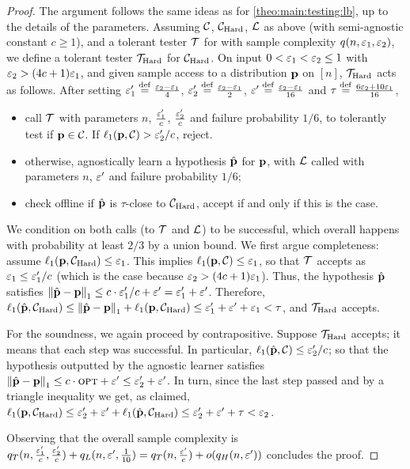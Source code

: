 \begin{proof}
The argument follows the same ideas as for \cref{theo:main:testing:lb}, up to the details of the parameters. Assuming $\class$, $\class_{\rm Hard}$, $\Learner$ as above (with semi-agnostic constant $c \geq 1$), and a tolerant tester $\Tester$ for \class with sample complexity $q(n,\eps_1,\eps_2)$, we define a tolerant tester $\Tester_{\rm Hard}$ for $\class_{\rm Hard}$. On input $0 < \eps_1 < \eps_2 \leq 1$ with $\eps_2 > (4c+1)\eps_1$, and given sample access to a distribution $\D$ on $[n]$, $\Tester_{\rm Hard}$ acts as follows. After setting $\eps^\prime_1\eqdef\frac{\eps_2-\eps_1}{4}$, $\eps^\prime_2\eqdef\frac{\eps_2-\eps_1}{2}$, $\eps^\prime \eqdef \frac{\eps_2-\eps_1}{16}$ and $\tau\eqdef \frac{6\eps_2+10\eps_1}{16}$,
\begin{itemize}
  \item call $\Tester$ with parameters $n$, $\frac{\eps^\prime_1}{c}$, $\frac{\eps^\prime_2}{c}$ and failure probability $1/6$, to tolerantly test if $\D\in\class$. If $\lp[1](\D,\class) > \eps^\prime_2/c$, reject.
  \item otherwise, agnostically learn a hypothesis $\hat{\D}$ for $\D$, with $\Learner$ called with parameters $n$, $\eps^\prime$ and failure probability $1/6$;
  \item check offline if $\hat{\D}$ is $\tau$-close to $\class_{\rm Hard}$, accept if and only if this is the case.
\end{itemize} 
We condition on both calls (to $\Tester$ and $\Learner$) to be successful, which overall happens with probability at least $2/3$ by a union bound. We first argue completeness: 
assume $\lp[1](\D,\class_{\rm Hard}) \leq \eps_1$. This implies $\lp[1](\D,\class) \leq \eps_1$, so that $\Tester$ accepts as $\eps_1 \leq \eps^\prime_1/c$ (which is the case because $\eps_2 > (4c+1)\eps_1$). Thus, the hypothesis $\hat{\D}$ satisfies $\normone{\hat{\D}-\D} \leq c\cdot \eps^\prime_1/c + \eps^\prime = \eps^\prime_1 + \eps^\prime$. Therefore, 
  $\lp[1](\hat{\D},\class_{\rm Hard}) \leq \normone{\hat{\D}-\D} + \lp[1](\D,\class_{\rm Hard}) \leq \eps^\prime_1 + \eps^\prime + \eps_1 < \tau$, and $\Tester_{\rm Hard}$ accepts.

For the soundness, we again proceed by contrapositive. Suppose $\Tester_{\rm Hard}$ accepts; it means that each step was successful. In particular, $\lp[1](\hat{\D},\class)\leq {\eps^\prime_2}/{c}$; so that the hypothesis outputted by the agnostic learner satisfies $\normone{\hat{\D}-\D} \leq c\cdot\opt+\eps^\prime\leq \eps^\prime_2 + \eps^\prime$. In turn, since the last step passed and by a triangle inequality  we get, as claimed, 
$\lp[1](\D, \class_{\rm Hard}) \leq \eps^\prime_2 + \eps^\prime + \lp[1](\hat{\D},\class_{\rm Hard}) \leq \eps^\prime_2 + \eps^\prime + \tau < \eps_2$.

Observing that the overall sample complexity is $q_T(n,\frac{\eps^\prime_1}{c},\frac{\eps^\prime_2}{c})+q_L(n,\eps^\prime, \frac{1}{10}) = q_T(n,\frac{\eps^\prime}{c})+\littleO{q_H(n,\eps^\prime)}$ concludes the proof.
\end{proof}


